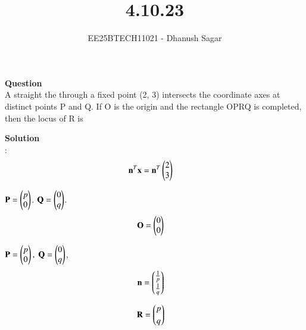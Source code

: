 \documentclass[journal]{IEEEtran}
\begin{document}



\title{4.10.23}
\author{EE25BTECH11021 - Dhanush Sagar}

{\let\newpage\relax\maketitle}

\renewcommand{\thefigure}{\theenumi}
\renewcommand{\thetable}{\theenumi}
\setlength{\intextsep}{10pt} %
\renewcommand{\thetable}{\theenumi}
\textbf{Question} \\

A straight the through a fixed point (2, 3) intersects the coordinate axes at distinct
points P and Q. If O is the origin and the rectangle OPRQ is completed, then the
locus of R is 

\textbf{Solution} \\
 :
\begin{align}
\mathbf{n}^T\mathbf{x} &= \mathbf{n}^T\begin{pmatrix}2\\3\end{pmatrix}  
\end{align}

 $\mathbf{P}=\begin{pmatrix}p\\0\end{pmatrix}$.
 $\mathbf{Q}=\begin{pmatrix}0\\q\end{pmatrix}$. \\


\begin{align}
\mathbf{O} &= \begin{pmatrix}0\\0\end{pmatrix}  
\end{align}




 $\mathbf{P}=\begin{pmatrix}p\\0\end{pmatrix},\; \mathbf{Q}=\begin{pmatrix}0\\q\end{pmatrix}$,  
\begin{align}
\mathbf{n} &= \begin{pmatrix}\tfrac{1}{p}\\[3pt]\tfrac{1}{q}\end{pmatrix}
\end{align}

\begin{align}
\mathbf{R} &= \begin{pmatrix}p\\[3pt]q\end{pmatrix}
\end{align}
\end{document}
